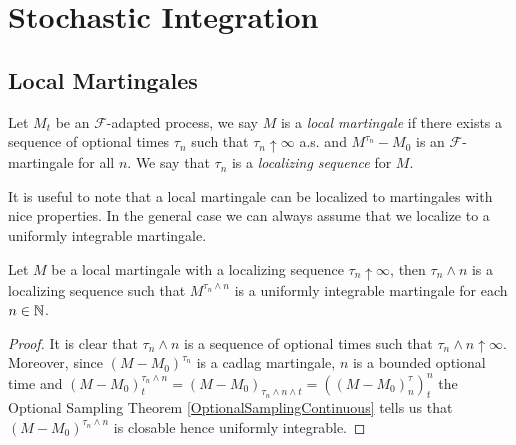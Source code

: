\section{Stochastic Integration}

\subsection{Local Martingales}

\begin{defn}Let $M_t$ be an $\mathcal{F}$-adapted process, we say $M$ is a \emph{local martingale} if there exists a sequence of optional times $\tau_n$ such that $\tau_n \uparrow \infty$ a.s. and $M^{\tau_n} - M_0$ is an $\mathcal{F}$-martingale for all $n$.  We say that $\tau_n$ is a \emph{localizing sequence} for $M$.
\end{defn}

It is useful  to note that a local martingale can be localized to martingales with nice properties.  In the general case we can always assume that we localize to a uniformly integrable martingale.
\begin{lem}\label{LocalMartingaleLocalizeToUniformlyIntegrable}Let $M$ be a local martingale with a localizing sequence $\tau_n \uparrow \infty$, then $\tau_n \wedge n$ is a localizing sequence such that $M^{\tau_n \wedge n}$ is a uniformly integrable martingale for each $n \in \mathbb{N}$.
\end{lem}
\begin{proof}
It is clear that $\tau_n \wedge n$ is a sequence of optional times such that $\tau_n \wedge n \uparrow \infty$.  Moreover, since $(M-M_0)^{\tau_n}$ is a cadlag martingale, $n$ is a bounded optional time and $(M-M_0)^{\tau_n \wedge n}_t = (M-M_0)_{\tau_n \wedge n \wedge t} = ((M-M_0)^\tau_n)^n_t$ the Optional Sampling Theorem \ref{OptionalSamplingContinuous} tells us that $(M-M_0)^{\tau_n \wedge n}$ is closable hence uniformly integrable.
\end{proof}

